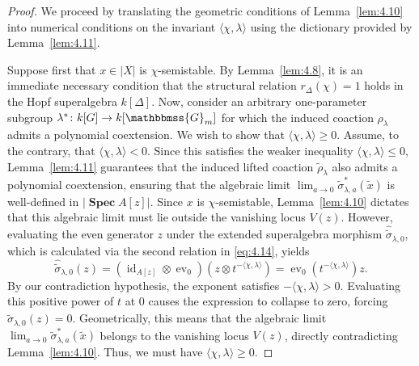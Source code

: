 \documentclass[11pt,a4paper,reqno,noamsfonts]{amsart}
\numberwithin{equation}{section}
\theoremstyle{definition}
\theoremstyle{remark}
\newcommand{\GG}{\ensuremath{\mathbbmss{G}}}
\DeclareMathOperator{\id}{id}
\DeclareMathOperator{\ev}{ev}
\DeclareMathOperator{\sSpec}{\mathbf{Spec}}
\begin{document}
\begin{proof}
We proceed by translating the geometric conditions of Lemma~\ref{lem:4.10} into numerical conditions on the invariant $\langle \chi, \lambda \rangle$ using the dictionary provided by Lemma~\ref{lem:4.11}.

Suppose first that $x \in \lvert X \rvert$ is $\chi$-semistable. By Lemma~\ref{lem:4.8}, it is an immediate necessary condition that the structural relation $r_\Delta(\chi) = 1$ holds in the Hopf superalgebra $k[\Delta]$. Now, consider an arbitrary one-parameter subgroup $\lambda^* \colon k[G] \to k[\GG_m]$ for which the induced coaction $\rho_\lambda$ admits a polynomial coextension. We wish to show that $\langle \chi, \lambda \rangle \ge 0$. Assume, to the contrary, that $\langle \chi, \lambda \rangle < 0$. Since this satisfies the weaker inequality $\langle \chi, \lambda \rangle \le 0$, Lemma~\ref{lem:4.11} guarantees that the induced lifted coaction $\tilde{\rho}_\lambda$ also admits a polynomial coextension, ensuring that the algebraic limit $\displaystyle\lim_{a \to 0} \tilde{\sigma}_{\lambda,a}^*(\tilde{x})$ is well-defined in $\lvert \sSpec A[z] \rvert$. Since $x$ is $\chi$-semistable, Lemma~\ref{lem:4.10} dictates that this algebraic limit must lie outside the vanishing locus $V(z)$. However, evaluating the even generator $z$ under the extended superalgebra morphism $\hat{\tilde{\sigma}}_{\lambda,0}$, which is calculated via the second relation in \eqref{eq:4.14}, yields
$$
\hat{\tilde{\sigma}}_{\lambda,0}(z) = (\id_{A[z]} \otimes \ev_0)(z \otimes t^{-\langle \chi ,\lambda \rangle }) = \ev_0(t^{-\langle \chi ,\lambda \rangle }) z .
$$
By our contradiction hypothesis, the exponent satisfies $-\langle \chi, \lambda \rangle > 0$. Evaluating this positive power of $t$ at $0$ causes the expression to collapse to zero, forcing $\hat{\tilde{\sigma}}_{\lambda,0}(z) = 0$. Geometrically, this means that the algebraic limit $\displaystyle\lim_{a \to 0} \tilde{\sigma}_{\lambda,a}^*(\tilde{x})$ belongs to the vanishing locus $V(z)$, directly contradicting Lemma~\ref{lem:4.10}. Thus, we must have $\langle \chi, \lambda \rangle \ge 0$.


\end{proof}
\end{document}
